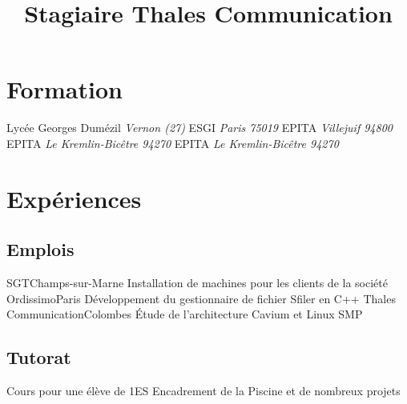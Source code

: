 \documentclass[11pt,a4paper]{moderncv}
\title{Stagiaire Thales Communication}				%
\begin{document}
\maketitle

\section{Formation}
		    {Lycée Georges Dumézil}{}
		    {\textit{Vernon (27)}}{}			%
		    {ESGI}{}
		    {\textit{Paris 75019}}{}			%
		    {EPITA}{}
		    {\textit{Villejuif 94800}}{}		%
		    {EPITA}{}
		    {\textit{Le Kremlin-Bicêtre 94270}}{} 	%
		    {EPITA}{}
		    {\textit{Le Kremlin-Bicêtre 94270}}{}	%



\section{Expériences}
\subsection{Emplois}
	      	    {SGT}{Champs-sur-Marne}
		    {}{Installation de machines pour les clients de la société}		%
		    {Ordissimo}{Paris}
		    {}{Développement du gestionnaire de fichier Sfiler en C++}		%
		    {Thales Communication}{Colombes}
		    {}{Étude de l'architecture Cavium et Linux SMP}			%

\subsection{Tutorat}
		    {}{}
		    {}{Cours pour une élève de 1\iere ES}				%
		    {}{}
		    {}{Encadrement de la Piscine et de nombreux projets}		%
\end{document}

